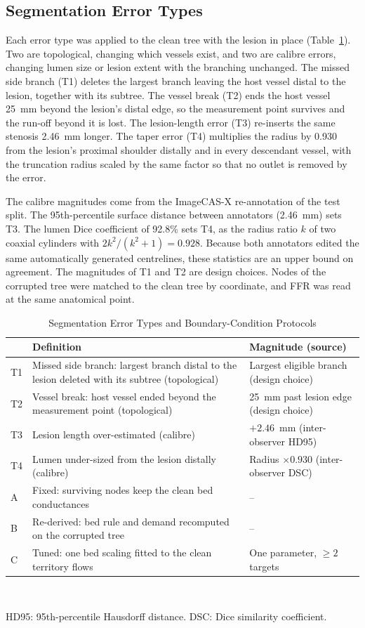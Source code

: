 \subsection{Segmentation Error Types}
Each error type was applied to the clean tree with the lesion in place (Table~\ref{tab:design}). Two are topological,
changing which vessels exist, and two are calibre errors, changing lumen size or lesion extent with the branching
unchanged. The missed side branch (T1) deletes the largest branch leaving the host vessel distal to the lesion,
together with its subtree. The vessel break (T2) ends the host vessel 25~mm beyond the lesion's distal edge, so the
measurement point survives and the run-off beyond it is lost. The lesion-length error (T3) re-inserts the same
stenosis 2.46~mm longer. The taper error (T4) multiplies the radius by 0.930 from the lesion's proximal shoulder
distally and in every descendant vessel, with the truncation radius scaled by the same factor so that no outlet is
removed by the error.

The calibre magnitudes come from the ImageCAS-X re-annotation of the test split. The 95th-percentile surface distance
between annotators (2.46~mm) sets T3. The lumen Dice coefficient of 92.8\% sets T4, as the radius ratio $k$ of two
coaxial cylinders with $2k^2/(k^2+1) = 0.928$. Because both annotators edited the same automatically generated
centrelines, these statistics are an upper bound on agreement. The magnitudes of T1 and T2 are design choices. Nodes
of the corrupted tree were matched to the clean tree by coordinate, and FFR was read at the same anatomical point.

\begin{table}[!t]
\caption{Segmentation Error Types and Boundary-Condition Protocols}
\label{tab:design}
\centering\footnotesize
\begin{tabular}{@{}p{0.9cm}p{4.0cm}p{2.3cm}@{}}
\toprule
 & Definition & Magnitude (source)\\
\midrule
T1 & Missed side branch: largest branch distal to the lesion deleted with its subtree (topological) & Largest eligible branch (design choice)\\
T2 & Vessel break: host vessel ended beyond the measurement point (topological) & 25~mm past lesion edge (design choice)\\
T3 & Lesion length over-estimated (calibre) & $+2.46$~mm (inter-observer HD95)\\
T4 & Lumen under-sized from the lesion distally (calibre) & Radius $\times 0.930$ (inter-observer DSC)\\
\midrule
A & Fixed: surviving nodes keep the clean bed conductances & --\\
B & Re-derived: bed rule and demand recomputed on the corrupted tree & --\\
C & Tuned: one bed scaling fitted to the clean territory flows & One parameter, $\geq 2$ targets\\
\bottomrule
\end{tabular}
\\[2pt]
\parbox{\columnwidth}{\footnotesize HD95: 95th-percentile Hausdorff distance. DSC: Dice similarity coefficient.}
\end{table}

